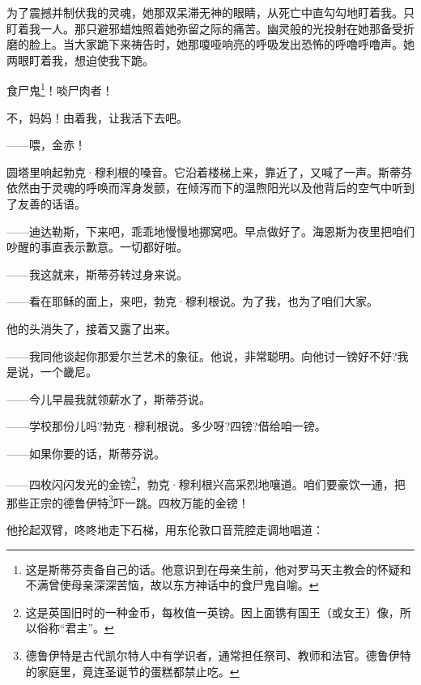 \par 为了震撼并制伏我的灵魂，她那双呆滞无神的眼睛，从死亡中直勾勾地盯着我。只盯着我一人。那只避邪蜡烛照着她弥留之际的痛苦。幽灵般的光投射在她那备受折磨的脸上。当大家跪下来祷告时，她那嗄哑响亮的呼吸发出恐怖的呼噜呼噜声。她两眼盯着我，想迫使我下跪。
\par 食尸鬼\footnote{这是斯蒂芬责备自己的话。他意识到在母亲生前，他对罗马天主教会的怀疑和不满曾使母亲深深苦恼，故以东方神话中的食尸鬼自喻。}！啖尸肉者！
\par 不，妈妈！由着我，让我活下去吧。
\par ——喂，金赤！
\par 圆塔里响起勃克·穆利根的嗓音。它沿着楼梯上来，靠近了，又喊了一声。斯蒂芬依然由于灵魂的呼唤而浑身发颤，在倾泻而下的温煦阳光以及他背后的空气中听到了友善的话语。
\par ——迪达勒斯，下来吧，乖乖地慢慢地挪窝吧。早点做好了。海恩斯为夜里把咱们吵醒的事直表示歉意。一切都好啦。
\par ——我这就来，斯蒂芬转过身来说。
\par ——看在耶稣的面上，来吧，勃克·穆利根说。为了我，也为了咱们大家。
\par 他的头消失了，接着又露了出来。
\par ——我同他谈起你那爱尔兰艺术的象征。他说，非常聪明。向他讨一镑好不好?我是说，一个畿尼。
\par ——今儿早晨我就领薪水了，斯蒂芬说。
\par ——学校那份儿吗?勃克·穆利根说。多少呀?四镑?借给咱一镑。
\par ——如果你要的话，斯蒂芬说。
\par ——四枚闪闪发光的金镑\footnote{这是英国旧时的一种金币，每枚值一英镑。因上面镌有国王（或女王）像，所以俗称“君主”。}，勃克·穆利根兴高采烈地嚷道。咱们要豪饮一通，把那些正宗的德鲁伊特\footnote{德鲁伊特是古代凯尔特人中有学识者，通常担任祭司、教师和法官。德鲁伊特的家庭里，竟连圣诞节的蛋糕都禁止吃。}吓一跳。四枚万能的金镑！
\par 他抡起双臂，咚咚地走下石梯，用东伦敦口音荒腔走调地唱道：
